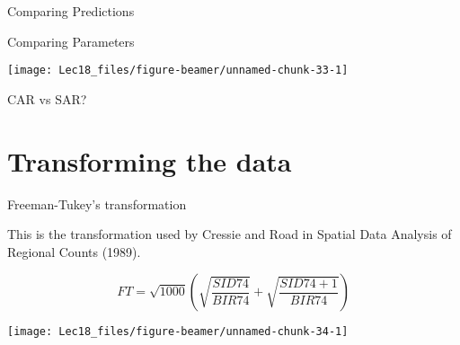 \documentclass[11pt,ignorenonframetext,]{beamer}
\newenvironment{Shaded}{}{}
\newcommand{\CommentTok}[1]{\textcolor[rgb]{0.38,0.63,0.69}{\textit{#1}}}
\newcommand{\DecValTok}[1]{\textcolor[rgb]{0.25,0.63,0.44}{#1}}
\newcommand{\KeywordTok}[1]{\textcolor[rgb]{0.00,0.44,0.13}{\textbf{#1}}}
\newcommand{\NormalTok}[1]{#1}
\newcommand{\OperatorTok}[1]{\textcolor[rgb]{0.40,0.40,0.40}{#1}}
\let\oldShaded\Shaded
\let\endoldShaded\endShaded
\renewenvironment{Shaded}{\footnotesize\begin{spacing}{0.9}\oldShaded}{\endoldShaded\end{spacing}}
\begin{document}
\begin{frame}[fragile,t]{Comparing Predictions}
\protect\hypertarget{comparing-predictions}{}

\begin{Shaded}
\end{Shaded}

\end{frame}

\begin{frame}{Comparing Parameters}
\protect\hypertarget{comparing-parameters}{}

\begin{center}\texttt{[image: Lec18\_files/figure-beamer/unnamed-chunk-33-1]} \end{center}

\end{frame}

\begin{frame}{CAR vs SAR?}
\protect\hypertarget{car-vs-sar}{}

\end{frame}

\hypertarget{transforming-the-data}{%
\section{Transforming the data}\label{transforming-the-data}}

\begin{frame}{Freeman-Tukey's transformation}
\protect\hypertarget{freeman-tukeys-transformation}{}

This is the transformation used by Cressie and Road in Spatial Data
Analysis of Regional Counts (1989).

\footnotesize

\[
FT = \sqrt{1000} \left( \sqrt{\frac{SID74}{BIR74}} + \sqrt{\frac{SID74+1}{BIR74}} \right)
\]

\begin{center}\texttt{[image: Lec18\_files/figure-beamer/unnamed-chunk-34-1]} \end{center}

\end{frame}
\end{document}
